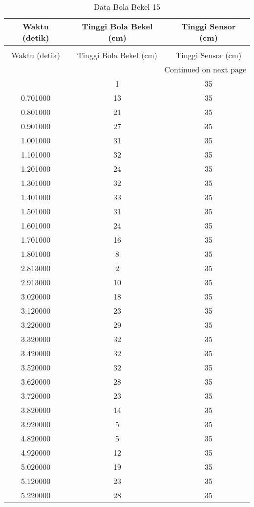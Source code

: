 \begin{longtable}[htbp]{|c|c|c|}
\caption{Data Bola Bekel 15} \\
\hline
Waktu (detik) & Tinggi Bola Bekel (cm) & Tinggi Sensor (cm) \\ \hline
\endfirsthead
\caption[]{Data Bola Bekel 15} \\
\hline
Waktu (detik) & Tinggi Bola Bekel (cm) & Tinggi Sensor (cm) \\ \hline
\endhead
\multicolumn{3}{r}{Continued on next page} \\
\endfoot
\endlastfoot
0.601000 & 1 & 35 \\ \hline
0.701000 & 13 & 35 \\ \hline
0.801000 & 21 & 35 \\ \hline
0.901000 & 27 & 35 \\ \hline
1.001000 & 31 & 35 \\ \hline
1.101000 & 32 & 35 \\ \hline
1.201000 & 24 & 35 \\ \hline
1.301000 & 32 & 35 \\ \hline
1.401000 & 33 & 35 \\ \hline
1.501000 & 31 & 35 \\ \hline
1.601000 & 24 & 35 \\ \hline
1.701000 & 16 & 35 \\ \hline
1.801000 & 8 & 35 \\ \hline
2.813000 & 2 & 35 \\ \hline
2.913000 & 10 & 35 \\ \hline
3.020000 & 18 & 35 \\ \hline
3.120000 & 23 & 35 \\ \hline
3.220000 & 29 & 35 \\ \hline
3.320000 & 32 & 35 \\ \hline
3.420000 & 32 & 35 \\ \hline
3.520000 & 32 & 35 \\ \hline
3.620000 & 28 & 35 \\ \hline
3.720000 & 23 & 35 \\ \hline
3.820000 & 14 & 35 \\ \hline
3.920000 & 5 & 35 \\ \hline
4.820000 & 5 & 35 \\ \hline
4.920000 & 12 & 35 \\ \hline
5.020000 & 19 & 35 \\ \hline
5.120000 & 23 & 35 \\ \hline
5.220000 & 28 & 35 \\ \hline

\end{longtable}
